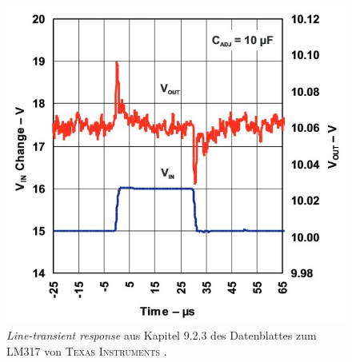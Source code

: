 	\begin{figure}
		\centering
		\includegraphics[width=.7\textwidth]{referenzen/line-transient-regulation.jpg}
		\caption[\textit{Line-transient response} aus Kapitel 9.2.3 des Datenblattes zum LM317 von \textsc{Texas Instruments}]{\textit{Line-transient response} aus Kapitel 9.2.3 des Datenblattes zum LM317 von \textsc{Texas Instruments} \cite{datasheet.LM317.TexasInstruments.2021}.}
		\label{fig:line transient response}
	\end{figure}
